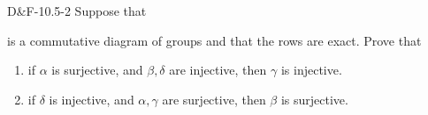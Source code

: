 \documentclass{article}
\begin{document}
	\begin{prb}{D\&F-10.5-2}
		Suppose that 
		\begin{center}
		\end{center}
		is a commutative diagram of groups and that the rows are exact. Prove that \vspace{-0.25cm}
		\begin{enumerate}[itemsep =-2pt,label = \textbf{(\alph{*})}]
			\item if $\alpha$ is surjective, and $\beta,\delta$ are injective, then $\gamma$ is injective. 
			\item if $\delta$ is injective, and $\alpha,\gamma$ are surjective, then $\beta$ is surjective. 
		\end{enumerate}
	\end{prb}
	
\end{document}
